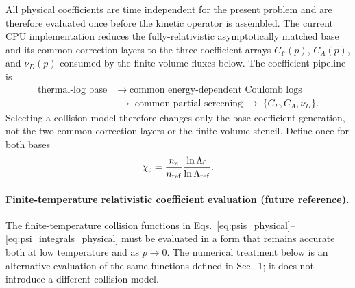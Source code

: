 \documentclass[11pt]{article}
\begin{document}
All physical coefficients are time independent for the present problem and are therefore
evaluated once before the kinetic operator is assembled.  The current CPU implementation
reduces the fully-relativistic asymptotically matched base and its common correction
layers to the three coefficient arrays $C_F(p)$, $C_A(p)$, and $\nu_D(p)$ consumed by
the finite-volume fluxes below.  The coefficient pipeline is
\begin{equation}
 \begin{aligned}
 \text{thermal-log base}
 &\;\longrightarrow\;\text{common energy-dependent Coulomb logs}\\
 &\;\longrightarrow\;\text{common partial screening}
 \;\longrightarrow\;\{C_F,C_A,\nu_D\}.
 \end{aligned}
 \label{eq:collision_layer_pipeline}
\end{equation}
Selecting a collision model therefore changes only the base coefficient generation, not
the two common correction layers or the finite-volume stencil.  Define once for both
bases
\begin{equation}
 \chi_c=\frac{n_e}{n_{\rm ref}}
        \frac{\ln\Lambda_0}{\ln\Lambda_{\rm ref}}.
 \label{eq:common_collision_scaling}
\end{equation}

\paragraph{Finite-temperature relativistic coefficient evaluation (future reference).}
The finite-temperature collision functions in
Eqs.~\eqref{eq:psis_physical}--\eqref{eq:psi_integrals_physical} must be evaluated in a
form that remains accurate both at low temperature and as $p\rightarrow0$.  The
numerical treatment below is an alternative evaluation of the same functions defined in
Sec.~1; it does not introduce a different collision model.
\end{document}
